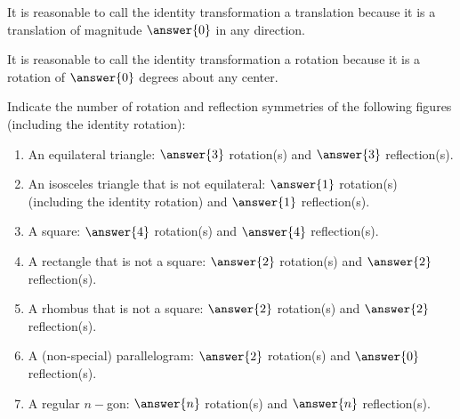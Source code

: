 \documentclass[nooutcomes]{ximera}
\begin{document}
\begin{question}
It is reasonable to call the identity transformation a translation because it is a translation of magnitude $\answer{0}$ in any direction.  

It is reasonable to call the identity transformation a rotation because it is a rotation of $\answer{0}$ degrees about any center.  
\end{question}

\begin{question}
Indicate the number of rotation and reflection symmetries of the following figures (including the identity rotation): 
\begin{enumerate}
\item An equilateral triangle: $\answer{3}$ rotation(s) and $\answer{3}$ reflection(s). 
\item An isosceles triangle that is not equilateral: $\answer{1}$ rotation(s) (including the identity rotation) and $\answer{1}$ reflection(s).
\item A square: $\answer{4}$ rotation(s) and $\answer{4}$ reflection(s).
\item A rectangle that is not a square: $\answer{2}$ rotation(s) and $\answer{2}$ reflection(s).
\item A rhombus that is not a square: $\answer{2}$ rotation(s) and $\answer{2}$ reflection(s).
\item A (non-special) parallelogram: $\answer{2}$ rotation(s) and $\answer{0}$ reflection(s).
\item A regular $n-$gon: $\answer{n}$ rotation(s) and $\answer{n}$ reflection(s).
\end{enumerate}
\end{question}

\end{document}
